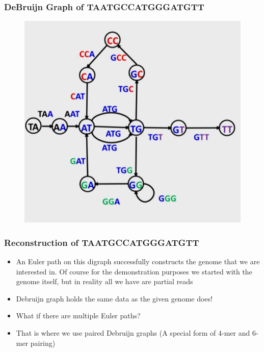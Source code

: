 \documentclass{beamer}
\begin{document}

\begin{frame}
\frametitle{DeBruijn Graph of TAATGCCATGGGATGTT}
\begin{figure}[h]
\includegraphics[scale = 0.4]{gluingfinal.png}
\end{figure}
\end{frame}


\begin{frame}
\frametitle{Reconstruction of TAATGCCATGGGATGTT}
\begin{itemize}
\item An Euler path on this digraph successfully constructs the genome that we are interested in. Of course for the demonstration purposes we started with the genome itself, but in reality all we have are partial reads
\pause
\item Debruijn graph holds the same data as the given genome does!
\pause
\item What if there are multiple Euler paths?
\pause
\item That is where we use paired Debruijn graphs (A special form of 4-mer and 6-mer pairing)
\end{itemize}
\end{frame}

\end{document}
